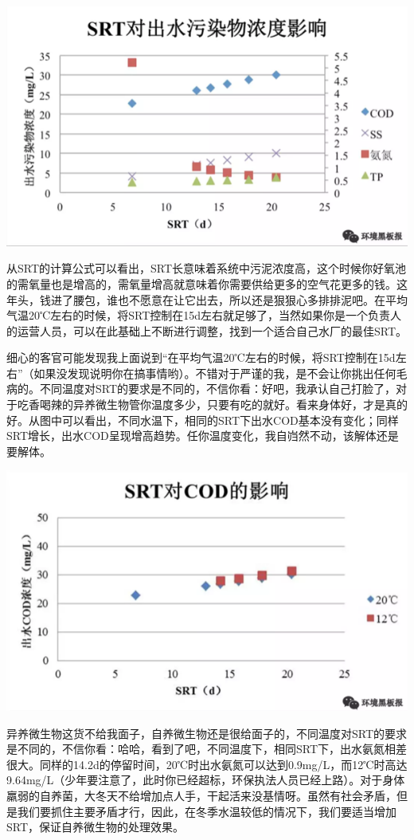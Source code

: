 \documentclass[]{book}
\begin{document}
\includegraphics[width=8.33in]{images/srt2}

从SRT的计算公式可以看出，SRT长意味着系统中污泥浓度高，这个时候你好氧池的需氧量也是增高的，需氧量增高就意味着你需要供给更多的空气花更多的钱。这年头，钱进了腰包，谁也不愿意在让它出去，所以还是狠狠心多排排泥吧。在平均气温20℃左右的时候，将SRT控制在15d左右就足够了，当然如果你是一个负责人的运营人员，可以在此基础上不断进行调整，找到一个适合自己水厂的最佳SRT。

细心的客官可能发现我上面说到``在平均气温20℃左右的时候，将SRT控制在15d左右''（如果没发现说明你在搞事情哟）。不错对于严谨的我，是不会让你挑出任何毛病的。不同温度对SRT的要求是不同的，不信你看：好吧，我承认自己打脸了，对于吃香喝辣的异养微生物管你温度多少，只要有吃的就好。看来身体好，才是真的好。从图中可以看出，不同水温下，相同的SRT下出水COD基本没有变化；同样SRT增长，出水COD呈现增高趋势。任你温度变化，我自岿然不动，该解体还是要解体。

\includegraphics[width=8.33in]{images/srt3}

异养微生物这货不给我面子，自养微生物还是很给面子的，不同温度对SRT的要求是不同的，不信你看：哈哈，看到了吧，不同温度下，相同SRT下，出水氨氮相差很大。同样的14.2d的停留时间，20℃时出水氨氮可以达到0.9mg/L，而12℃时高达9.64mg/L（少年要注意了，此时你已经超标，环保执法人员已经上路）。对于身体羸弱的自养菌，大冬天不给增加点人手，干起活来没基情呀。虽然有社会矛盾，但是我们要抓住主要矛盾才行，因此，在冬季水温较低的情况下，我们要适当增加SRT，保证自养微生物的处理效果。
\end{document}
